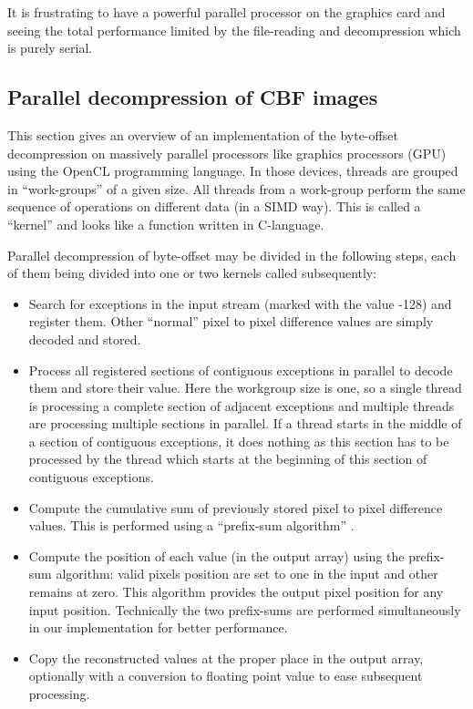 \documentclass[preprint]{iucr}              %
\begin{document}
It is frustrating to have a powerful parallel processor on the
graphics card and seeing the total performance limited by the file-reading
 and decompression which is purely serial.

\subsection{Parallel decompression of CBF images}
 
This section gives an overview of an implementation of the byte-offset
decompression on massively parallel processors like graphics processors
(GPU) using the OpenCL \cite{opencl} programming language.
In those devices, threads are grouped in ``work-groups'' of a given size.
All threads from a work-group perform the same sequence of operations on
different data (in a SIMD way).
This is called a ``kernel'' and looks like a function written in C-language.

Parallel decompression of byte-offset may be divided in the following steps,
each of them being divided into one or two kernels called subsequently:
\begin{itemize}
  \item Search for exceptions in the input stream (marked with the value -128)
  and register them. Other ``normal'' pixel to pixel difference values are simply decoded and stored.
  \item Process all registered sections of contiguous exceptions in parallel to decode them and store their value.
  Here the workgroup size is one, so a single thread is processing a complete
  section of adjacent exceptions and multiple threads are processing multiple
  sections in parallel.
  If a thread starts in the middle of a section of contiguous exceptions,
  it does nothing as this section has to be processed by the thread
  which starts at the beginning of this section of contiguous exceptions.
  \item Compute the cumulative sum of previously stored pixel to pixel difference values.
  This is performed using a ``prefix-sum algorithm'' \cite{scan}.
  \item Compute the position of each value (in the output array)
  using the prefix-sum algorithm: valid pixels position are set to one in the
  input and other remains at zero. This algorithm provides the output pixel
  position for any input position.
  Technically the two prefix-sums are performed simultaneously in our
  implementation for better performance.
  \item Copy the reconstructed values at the proper place in
  the output array, optionally with a conversion to floating point value to
  ease subsequent processing.
\end{itemize} 
\end{document}
